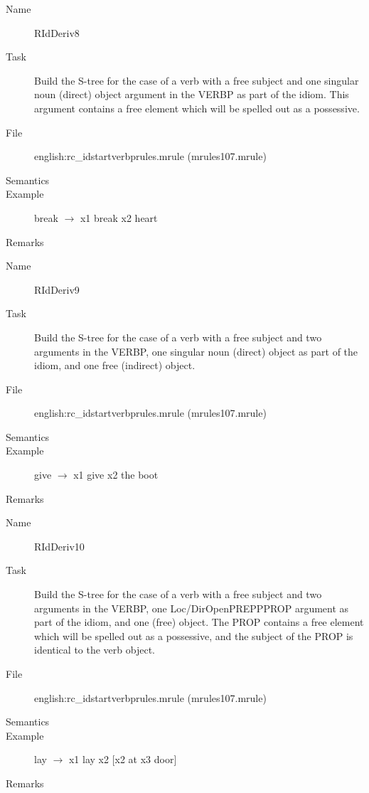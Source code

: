 \begin{description}
\vspace{1 cm}
\begin{description}
\item[Name] RIdDeriv8
\item[Task] Build the S-tree for the case of a verb with a free subject and 
one singular noun (direct) object 
argument in the VERBP as part of the idiom. This argument contains a free 
element which will be spelled out as a possessive.
\item[File] english:rc\_idstartverbprules.mrule (mrules107.mrule)
\item[Semantics]
\item[Example] break $\rightarrow$ x1 break x2 heart
\item[Remarks]
\end{description}

\vspace{1 cm}
\begin{description}
\item[Name] RIdDeriv9
\item[Task] Build the S-tree for the case of a verb with a free subject and 
two arguments in the 
VERBP, one singular noun (direct) object as part of the idiom, and one free 
(indirect) object.
\item[File] english:rc\_idstartverbprules.mrule (mrules107.mrule)
\item[Semantics]
\item[Example] give $\rightarrow$ x1 give x2 the boot
\item[Remarks]
\end{description}

\vspace{1 cm}
\begin{description}
\item[Name] RIdDeriv10
\item[Task] Build the S-tree for the case of a verb with a free subject and 
two arguments in the 
VERBP, one Loc/DirOpenPREPPPROP argument as part of the idiom, and one (free) 
object. The PROP contains a free 
element which will be spelled out as a possessive, and the subject of the PROP 
is identical to the verb object.
\item[File] english:rc\_idstartverbprules.mrule (mrules107.mrule)
\item[Semantics]
\item[Example] lay $\rightarrow$ x1 lay x2 [x2 at x3 door]
\item[Remarks]
\end{description}


\end{description}
